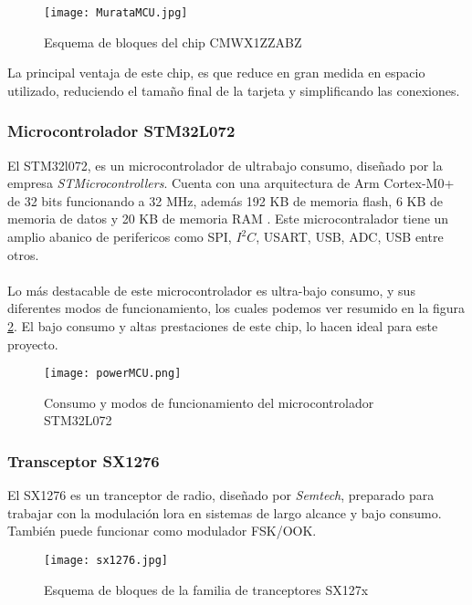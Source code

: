 	
	\begin{figure}[hbt!]
		\centering
		\texttt{[image: MurataMCU.jpg]}
		\caption{Esquema de bloques del chip CMWX1ZZABZ \citep{Murata}}
		\label{fig:CMWX1ZZABZ}
	\end{figure}
	
	La principal ventaja de este chip, es que reduce en gran medida en espacio utilizado, reduciendo el tamaño final de la tarjeta  y simplificando las conexiones.
	\subsubsection{Microcontrolador STM32L072}
	
	El STM32l072, es un microcontrolador de ultrabajo consumo, diseñado por la empresa \textit{STMicrocontrollers}. Cuenta con una arquitectura de Arm Cortex-M0+ de 32 bits funcionando a 32 MHz, además 192 KB de memoria flash, 6 KB de memoria de datos y 20 KB de memoria RAM \citep{STMpow}. Este microcontralador tiene un amplio abanico de perifericos como SPI, $I^2C$, USART, USB, ADC, USB entre otros. 
	\paragraph{}	
	Lo más destacable de este microcontrolador es ultra-bajo consumo, y sus diferentes modos de funcionamiento, los cuales podemos ver resumido en la figura \ref{fig::powerMCU}. El bajo consumo y altas prestaciones de este chip, lo hacen ideal para este proyecto.
	
	\begin{figure}[hbt!]
		\centering
		\texttt{[image: powerMCU.png]}
		\caption{Consumo y modos de funcionamiento del microcontrolador STM32L072 \citep{STMpow}}
		\label{fig::powerMCU}
	\end{figure}
	
	\subsubsection{Transceptor SX1276}
	
	El SX1276 es un tranceptor de radio, diseñado por \textit{Semtech}, preparado para trabajar con la modulación lora en sistemas de largo alcance y bajo consumo. También puede funcionar como modulador FSK/OOK.
	
	\begin{figure}[hbt!]
		\centering
		\texttt{[image: sx1276.jpg]}
		\caption{Esquema de bloques de la familia de tranceptores SX127x \citep{SX1276}}
	\end{figure}
	
